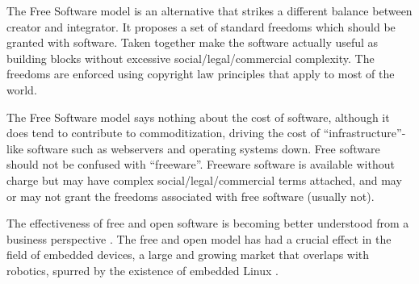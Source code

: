 The Free Software model is an alternative that strikes a different
balance between creator and integrator.  It proposes a set of standard
freedoms which should be granted with software. Taken together make
the software actually useful as building blocks without excessive
social/legal/commercial complexity.  The freedoms are enforced using
copyright law principles that apply to most of the world.

The Free Software model says nothing about the cost of software,
although it does tend to contribute to commoditization, driving the
cost of ``infrastructure''-like software such as webservers and
operating systems down.  Free software should not be confused with
``freeware''.  Freeware software is available without charge but may
have complex social/legal/commercial terms attached, and may
or may not grant the freedoms associated with free software
(usually not).

The effectiveness of free and open software is 
becoming better understood from a business
perspective \cite{vonkrogh2006promise}.
%
The free and open model has had a crucial 
effect in the field of embedded devices,
a large and growing market that overlaps
with robotics, spurred by the existence
of embedded Linux \cite{henkel2006selective}.












